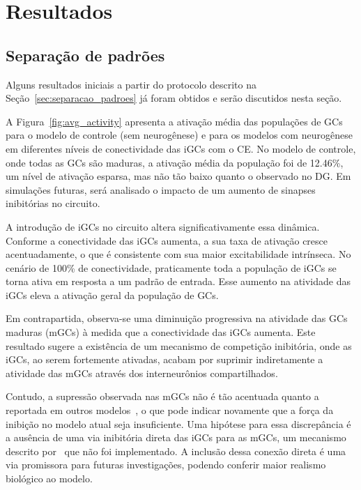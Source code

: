 \chapter{Resultados}

\section{Separação de padrões}


Alguns resultados iniciais a partir do protocolo descrito na Seção~\ref{sec:separacao_padroes} já foram obtidos e serão discutidos
nesta seção.

A Figura~\ref{fig:avg_activity} apresenta a ativação média das populações de GCs para o modelo de controle (sem neurogênese) e
para os modelos com neurogênese em diferentes níveis de conectividade das iGCs com o CE. No modelo de controle, onde todas as GCs
são maduras, a ativação média da população foi de 12.46\%, um nível de ativação esparsa, mas não tão baixo quanto o observado no
DG. Em simulações futuras, será analisado o impacto de um aumento de sinapses inibitórias no circuito.

A introdução de iGCs no circuito altera significativamente essa dinâmica. Conforme a conectividade das iGCs aumenta, a sua taxa de
ativação cresce acentuadamente, o que é consistente com sua maior excitabilidade intrínseca. No cenário de 100\% de conectividade,
praticamente toda a população de iGCs se torna ativa em resposta a um padrão de entrada. Esse aumento na atividade das iGCs eleva
a ativação geral da população de GCs.

Em contrapartida, observa-se uma diminuição progressiva na atividade das GCs maduras (mGCs) à medida que a conectividade das iGCs
aumenta. Este resultado sugere a existência de um mecanismo de competição inibitória, onde as iGCs, ao serem fortemente ativadas,
acabam por suprimir indiretamente a atividade das mGCs através dos interneurônios compartilhados.

Contudo, a supressão observada nas mGCs não é tão acentuada quanto a reportada em outros modelos~\cite{kimEffect2024}, o que pode
indicar novamente que a força da inibição no modelo atual seja insuficiente. Uma hipótese para essa discrepância é a ausência de
uma via inibitória direta das iGCs para as mGCs, um mecanismo descrito por~ que não foi
implementado. A inclusão dessa conexão direta é uma via promissora para futuras investigações, podendo conferir maior realismo
biológico ao modelo.

